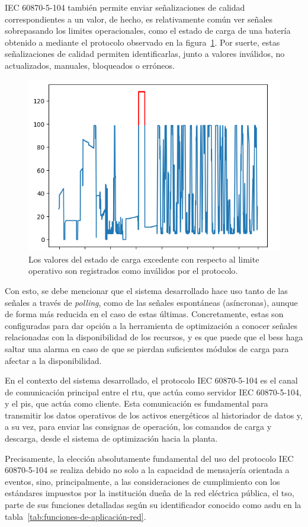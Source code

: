 IEC 60870-5-104 también permite enviar señalizaciones de calidad correspondientes a un valor, de hecho, es relativamente común ver señales sobrepasando los limites operacionales, como el estado de carga de una batería obtenido a mediante el protocolo observado en la figura~\ref{fig:overflow-soc}. Por suerte, estas señalizaciones de calidad permiten identificarlas, junto a valores inválidos, no actualizados, manuales, bloqueados o erróneos.

\begin{figure}
  \centering
  \includegraphics[width=0.5\linewidth]{figures/overflow-soc.png}
  \caption{Los valores del estado de carga excedente con respecto al limite operativo son registrados como inválidos por el protocolo.}
  \label{fig:overflow-soc}
\end{figure}

Con esto, se debe mencionar que el sistema desarrollado hace uso tanto de las señales a través de \textit{polling}, como de las señales espontáneas (asíncronas), aunque de forma más reducida en el caso de estas últimas. Concretamente, estas son configuradas para dar opción a la herramienta de optimización a conocer señales relacionadas con la disponibilidad de los recursos, y es que puede que el \gls{bess} haga saltar una alarma en caso de que se pierdan suficientes módulos de carga para afectar a la disponibilidad.

En el contexto del sistema desarrollado, el protocolo IEC 60870-5-104 es el canal de comunicación principal entre el \gls{rtu}, que actúa como servidor IEC 60870-5-104, y el \gls{pis}, que actúa como cliente. Esta comunicación es fundamental para transmitir los datos operativos de los activos energéticos al historiador de datos y, a su vez, para enviar las consignas de operación, los comandos de carga y descarga, desde el sistema de optimización hacia la planta.

Precisamente, la elección absolutamente fundamental del uso del protocolo IEC 60870-5-104 se realiza debido no solo a la capacidad de mensajería orientada a eventos, sino, principalmente, a las consideraciones de cumplimiento con los estándares impuestos por la institución dueña de la red eléctrica pública, el \gls{tso}, parte de sus funciones detalladas según su identificador conocido como \gls{asdu} en la tabla~\ref{tab:funciones-de-aplicación-red}.

